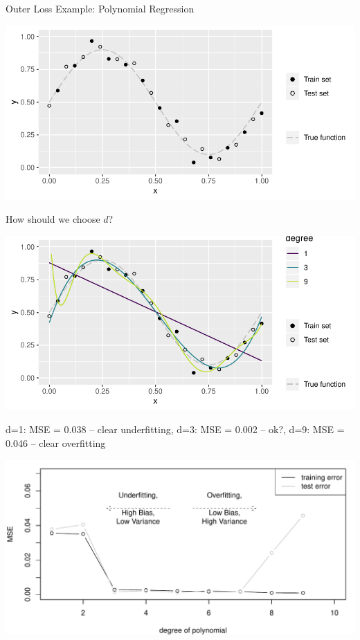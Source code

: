     \begin{frame}[c,allowframebreaks]{Outer Loss Example: Polynomial Regression}

    \begin{center}
    \includegraphics[width=.7\textwidth]{images/polyt}
    \end{center}

    \framebreak

    How should we choose $d$?

    \begin{center}
    \includegraphics[width=.5\textwidth]{images/poly-test}
    \end{center}

    d=1: MSE = 0.038 -- clear underfitting,
    d=3: MSE = 0.002 -- ok?,
    d=9: MSE = 0.046 -- clear overfitting

    \framebreak

    \begin{center}
    \includegraphics[width=.9\textwidth]{images/bias-variance}
    \end{center}

    \end{frame}

